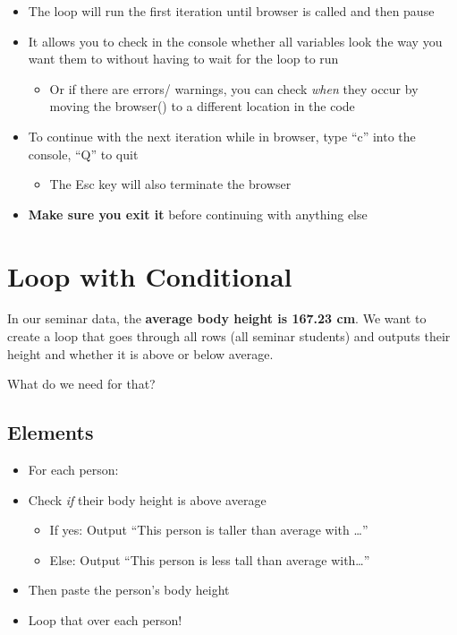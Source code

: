 \documentclass[
]{book}
\providecommand{\tightlist}{%
  \setlength{\itemsep}{0pt}\setlength{\parskip}{0pt}}
\begin{document}
\begin{itemize}
\item
  The loop will run the first iteration until browser is called and then pause
\item
  It allows you to check in the console whether all variables look the way you want them to without having to wait for the loop to run

  \begin{itemize}
  \tightlist
  \item
    Or if there are errors/ warnings, you can check \emph{when} they occur by moving the browser() to a different location in the code
  \end{itemize}
\item
  To continue with the next iteration while in browser, type ``c'' into the console, ``Q'' to quit

  \begin{itemize}
  \tightlist
  \item
    The Esc key will also terminate the browser
  \end{itemize}
\item
  \textbf{Make sure you exit it} before continuing with anything else
\end{itemize}

\section{Loop with Conditional}\label{loop-with-conditional}

In our seminar data, the \textbf{average body height is 167.23 cm}. We want to create a loop that goes through all rows (all seminar students) and outputs their height and whether it is above or below average.

What do we need for that?

\subsection{Elements}\label{elements}

\begin{itemize}
\tightlist
\item
  For each person:
\item
  Check \emph{if} their body height is above average

  \begin{itemize}
  \tightlist
  \item
    If yes: Output ``This person is taller than average with \ldots{}''
  \item
    Else: Output ``This person is less tall than average with\ldots{}''
  \end{itemize}
\item
  Then paste the person's body height
\item
  Loop that over each person!
\end{itemize}
\end{document}
